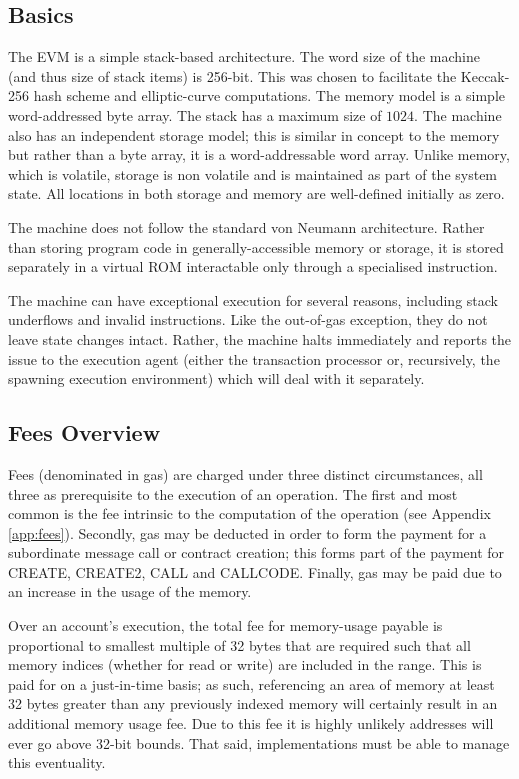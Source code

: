 \documentclass[9pt,oneside]{amsart}
\begin{document}
\begin{multicols}{2}
\subsection{Basics}

The EVM is a simple stack-based architecture. The word size of the machine (and thus size of stack items) is 256-bit. This was chosen to facilitate the Keccak-256 hash scheme and elliptic-curve computations. The memory model is a simple word-addressed byte array. The stack has a maximum size of $1024$. The machine also has an independent storage model; this is similar in concept to the memory but rather than a byte array, it is a word-addressable word array. Unlike memory, which is volatile, storage is non volatile and is maintained as part of the system state. All locations in both storage and memory are well-defined initially as zero.

The machine does not follow the standard von Neumann architecture. Rather than storing program code in generally-accessible memory or storage, it is stored separately in a virtual ROM interactable only through a specialised instruction.

The machine can have exceptional execution for several reasons, including stack underflows and invalid instructions. Like the out-of-gas exception, they do not leave state changes intact. Rather, the machine halts immediately and reports the issue to the execution agent (either the transaction processor or, recursively, the spawning execution environment) which will deal with it separately.

\subsection{Fees Overview}

Fees (denominated in gas) are charged under three distinct circumstances, all three as prerequisite to the execution of an operation. The first and most common is the fee intrinsic to the computation of the operation (see Appendix \ref{app:fees}). Secondly, gas may be deducted in order to form the payment for a subordinate message call or contract creation; this forms part of the payment for {\small CREATE}, {\small CREATE2}, {\small CALL} and {\small CALLCODE}. Finally, gas may be paid due to an increase in the usage of the memory.

Over an account's execution, the total fee for memory-usage payable is proportional to smallest multiple of 32 bytes that are required such that all memory indices (whether for read or write) are included in the range. This is paid for on a just-in-time basis; as such, referencing an area of memory at least 32 bytes greater than any previously indexed memory will certainly result in an additional memory usage fee. Due to this fee it is highly unlikely addresses will ever go above 32-bit bounds. That said, implementations must be able to manage this eventuality.


\end{multicols}
\end{document}
